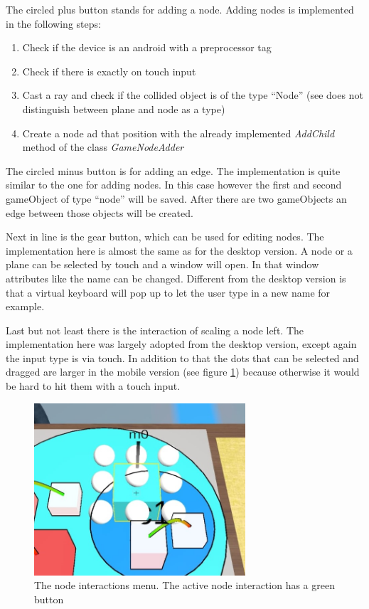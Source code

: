 The circled plus button stands for adding a \gls{node}.
Adding \glspl{node} is implemented in the following steps:
\begin{enumerate}
    \item Check if the device is an \gls{android} with a preprocessor tag
    \item Check if there is exactly on touch input
    \item Cast a ray and check if the collided object is of the type \enquote{Node} (\gls{see} does not distinguish between \gls{plane} and \gls{node} as a type)
    \item Create a \gls{node} ad that position with the already implemented \textit{AddChild} method of the class \textit{GameNodeAdder}
\end{enumerate}

The circled minus button is for adding an \gls{edge}.
The implementation is quite similar to the one for adding \glspl{node}.
In this case however the first and second \gls{gameObject} of type \enquote{\gls{node}} will be saved.
After there are two \glspl{gameObject} an \gls{edge} between those objects will be created.

Next in line is the gear button, which can be used for editing \glspl{node}.
The implementation here is almost the same as for the desktop version.
A \gls{node} or a \gls{plane} can be selected by touch and a window will open.
In that window attributes like the name can be changed.
Different from the desktop version is that a virtual keyboard will pop up to let the user type in a new name for example.

Last but not least there is the interaction of scaling a node left.
The implementation here was largely adopted from the desktop version, except again the input type is via touch.
In addition to that the dots that can be selected and dragged are larger in the mobile version (see figure \ref{fig:scale}) because otherwise it would be hard to hit them with a touch input.

\begin{figure}[htb]
    \centering
    \includegraphics[width=0.7\textwidth]{Implementation/img/scale.jpeg}
    \caption{The node interactions menu. The active node interaction has a green button}\label{fig:scale}
\end{figure}

